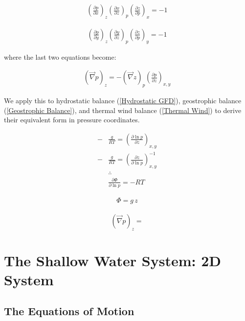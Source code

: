 \begin{align*}
    \left(\frac{\partial p}{\partial x}\right)_z
    \left(\frac{\partial x}{\partial z}\right)_p
    \left(\frac{\partial z}{\partial p}\right)_x
    =-1
\end{align*}

\begin{align*}
    \left(\frac{\partial p}{\partial y}\right)_z
    \left(\frac{\partial y}{\partial z}\right)_p
    \left(\frac{\partial z}{\partial p}\right)_y
    =-1
\end{align*}

\noindent where the last two equations become:

\begin{align}
    \left(\vec{\nabla}p\right)_z=-\left(\vec{\nabla}z\right)_p\left(\frac{\partial p}{\partial z}\right)_{x,y}
\end{align}

We apply this to hydrostatic balance (\ref{Hydrostatic GFD}), geostrophic balance (\ref{Geostrophic Balance}), and thermal wind balance (\ref{Thermal Wind}) to derive their equivalent form in pressure coordinates.

\begin{align}
    -&\frac{g}{RT}=\left(\frac{\partial \ln p}{\partial z}\right)_{x,y}\nonumber\\
    -&\frac{g}{RT}=\left(\frac{\partial z}{\partial \ln p}\right)_{x,y}^{-1}\nonumber\\
    &\therefore\nonumber
    \\
    &\boxed{\frac{\partial \Phi}{\partial \ln p}=-RT}\label{Hydrostatic Pressure}
\end{align}

\begin{align}
    \boxed{\Phi =g\,z}
\end{align}

\begin{align}
    \left(\vec{\nabla}p\right)_z=
\end{align}



\chapter{The Shallow Water System: 2D System}\label{Shallow Water System}

\section{The Equations of Motion}

